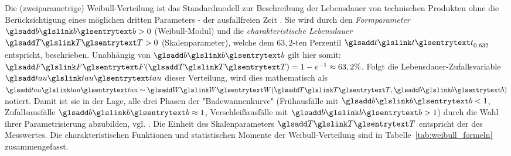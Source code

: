 Die (zweiparametrige) Weibull-Verteilung ist das Standardmodell zur Beschreibung der Lebensdauer von technischen Produkten ohne die Berücksichtigung eines möglichen dritten Parameters - der ausfallfreien Zeit .
Sie wird durch den \textit{Formparameter}  $\sym{b} > 0$ (Weibull-Modul) und die \textit{charakteristische Lebensdauer} $\sym{T} > 0$ (Skalenparameter), welche dem $63,2$-ten Perzentil $\sym{t}_{0,632}$ entspricht, beschrieben.
Unabhängig von $\sym{b}$ gilt hier somit: $\sym{F}(\sym{T})=1-e^{-1} \approx 63,2 \%$.
Folgt die Lebensdauer-Zufallsvariable $\sym{tau}$ dieser Verteilung, wird dies mathematisch als $\sym{tau} \sim \sym{W}(\sym{T}, \sym{b})$ notiert.
Damit ist sie in der Lage, alle drei Phasen der "Badewannenkurve" (Frühausfälle mit $\sym{b}<1$, Zufallsausfälle $\sym{b}\approx 1$, Verschleißausfälle mit $\sym{b}>1$) durch die Wahl ihrer Parametrisierung abzubilden, vgl. \textcite{Bertsche.2022}.
Die Einheit des Skalenparameters $\sym{T}$ entspricht der des Messwertes. Die charakteristischen Funktionen und statistischen Momente der Weibull-Verteilung sind in Tabelle~\ref{tab:weibull_formeln} zusammengefasst.

